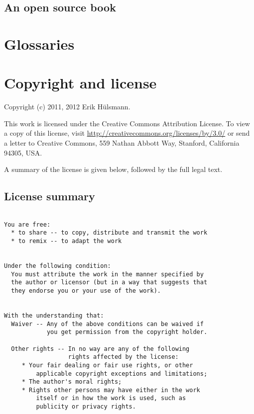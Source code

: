 \section{An open source book}
\label{sec-open-source-book}

\chapter{Glossaries}
\label{app-glossaries}

\printglossary[type=acronym]


\chapter{Copyright and license}
\label{app-copyright-license}

Copyright (c) 2011, 2012 Erik H\"ulsmann.


This work is licensed under the Creative Commons Attribution License.
To view a copy of this license, visit \url{http://creativecommons.org/licenses/by/3.0/}
or send a letter to Creative Commons, 559 Nathan Abbott Way,
Stanford, California 94305, USA.

A summary of the license is given below, followed by the full legal text.

\section{License summary}
\label{sec-license-summary}

\begin{verbatim}

You are free:
  * to share -- to copy, distribute and transmit the work
  * to remix -- to adapt the work


Under the following condition:
  You must attribute the work in the manner specified by
  the author or licensor (but in a way that suggests that
  they endorse you or your use of the work).


With the understanding that:
  Waiver -- Any of the above conditions can be waived if
            you get permission from the copyright holder.
  
  Other rights -- In no way are any of the following
                  rights affected by the license:
     * Your fair dealing or fair use rights, or other
         applicable copyright exceptions and limitations;
     * The author's moral rights;
     * Rights other persons may have either in the work
         itself or in how the work is used, such as
         publicity or privacy rights.

\end{verbatim}



